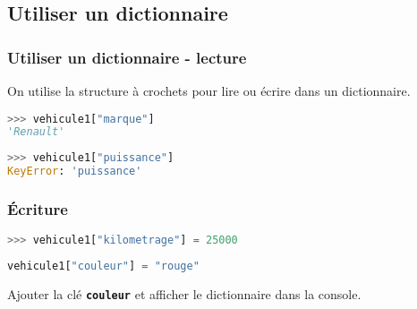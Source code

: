 \documentclass[svgnames,11pt]{beamer}
\begin{document}
\subsection{Utiliser un dictionnaire}
\begin{frame}[fragile]
    \frametitle{Utiliser un dictionnaire - lecture}

\begin{aretenir}[]
On utilise la structure à crochets pour lire ou écrire dans un dictionnaire.
\end{aretenir}

\begin{center}
\begin{lstlisting}[language=Python , basicstyle=\ttfamily\small, xleftmargin=2em, xrightmargin=2em]
>>> vehicule1["marque"]
'Renault'
\end{lstlisting}
\label{CODE}
\end{center}

\begin{center}
    \begin{lstlisting}[language=Python , basicstyle=\ttfamily\small, xleftmargin=2em, xrightmargin=2em]
>>> vehicule1["puissance"]
KeyError: 'puissance'
\end{lstlisting}
    \label{CODE}
    \end{center}

\end{frame}
\begin{frame}[fragile]
    \frametitle{Écriture}
    \begin{center}
    \begin{lstlisting}[language=Python , basicstyle=\ttfamily\small, xleftmargin=2em, xrightmargin=2em]
>>> vehicule1["kilometrage"] = 25000
\end{lstlisting}
    \label{CODE}
    \end{center}
\begin{center}
\begin{lstlisting}[language=Python , basicstyle=\ttfamily\small, xleftmargin=2em, xrightmargin=2em]
vehicule1["couleur"] = "rouge"
\end{lstlisting}
\label{CODE}
\end{center}
\begin{activite}
Ajouter la clé \textbf{\texttt{couleur}} et afficher le dictionnaire dans la console.
\end{activite}
\end{frame}
\end{document}

